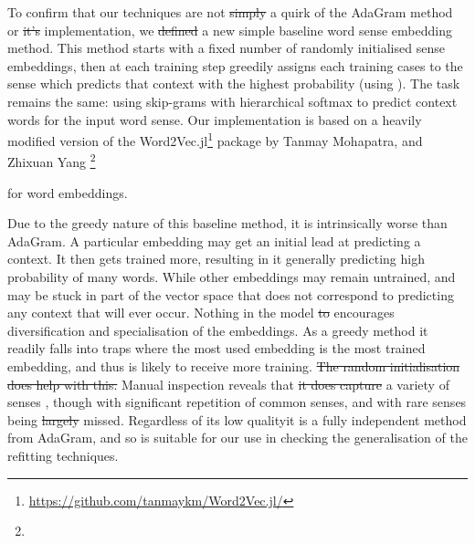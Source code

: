 \documentclass{sig-alternate}
\providecommand{\DIFadd}[1]{{\protect\color{blue}\uwave{#1}}} %
\providecommand{\DIFdel}[1]{{\protect\color{red}\sout{#1}}}                      %
\providecommand{\DIFaddbegin}{} %
\providecommand{\DIFaddend}{} %
\providecommand{\DIFdelbegin}{} %
\providecommand{\DIFdelend}{} %
\begin{document}
To confirm that our techniques are not \DIFdelbegin \DIFdel{simply }\DIFdelend \DIFaddbegin \DIFadd{merely }\DIFaddend a quirk of the AdaGram method or \DIFdelbegin \DIFdel{it's }\DIFdelend \DIFaddbegin \DIFadd{its }\DIFaddend implementation, we \DIFdelbegin \DIFdel{defined }\DIFdelend \DIFaddbegin \DIFadd{implemented }\DIFaddend a new simple baseline word sense embedding method.
This method starts with a fixed number of randomly initialised sense embeddings, then at each training step greedily assigns each training cases to the sense which predicts that context with the highest probability (using ). The task remains the same: using skip-grams with hierarchical softmax to predict context words for the input word sense.
Our implementation is based on a heavily modified version of the Word2Vec.jl\DIFaddbegin \footnote{\url{https://github.com/tanmaykm/Word2Vec.jl/}} \DIFaddend package by Tanmay Mohapatra, and Zhixuan Yang  \DIFdelbegin \footnote{%
} %
\addtocounter{footnote}{-1}%
\DIFdelend for word embeddings.

Due to the greedy nature of this baseline method, it is intrinsically worse than AdaGram. A particular embedding may get an initial lead at predicting a context. 
It then gets trained more, resulting in it generally predicting \DIFaddbegin \DIFadd{a }\DIFaddend high probability of many words.
While other embeddings may remain untrained, and may be stuck in part of the vector space that does not correspond to predicting any context that will ever occur.
Nothing in the model \DIFdelbegin \DIFdel{to }\DIFdelend encourages diversification and specialisation of the embeddings.
As a greedy method it readily falls into traps \DIFdelbegin %
\DIFdelend where the most used embedding is the most trained embedding, and thus is likely to receive more training. \DIFdelbegin \DIFdel{The random initialisation does help with this. }\DIFdelend Manual inspection reveals that \DIFdelbegin \DIFdel{it does capture }\DIFdelend a variety of senses \DIFaddbegin \DIFadd{are captured}\DIFaddend , though with significant repetition of common senses, and with rare senses being \DIFdelbegin \DIFdel{largely }\DIFdelend missed. Regardless of its low quality\DIFaddbegin \DIFadd{, }\DIFaddend it is a fully independent method from AdaGram, and so is suitable for our use in checking the generalisation of the refitting techniques.
\end{document}
